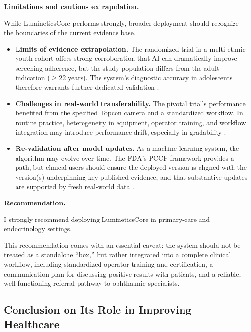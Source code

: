 \documentclass[sigplan,screen]{acmart}
\begin{document}
\textbf{Limitations and cautious extrapolation.}

While LumineticsCore performs strongly, broader deployment should recognize the boundaries of the current evidence base.

\begin{itemize}
\item \textbf{Limits of evidence extrapolation.} The randomized trial in a multi-ethnic youth cohort offers strong corroboration that AI can dramatically improve screening adherence, but the study population differs from the adult indication ($\geq$22 years). The system's diagnostic accuracy in adolescents therefore warrants further dedicated validation \cite{wolf2024autonomous}.

\item \textbf{Challenges in real-world transferability.} The pivotal trial's performance benefited from the specified Topcon camera and a standardized workflow. In routine practice, heterogeneity in equipment, operator training, and workflow integration may introduce performance drift, especially in gradability \cite{fda2018denovo_summary, abramoff2018pivotal}.

\item \textbf{Re-validation after model updates.} As a machine-learning system, the algorithm may evolve over time. The FDA's PCCP framework provides a path, but clinical users should ensure the deployed version is aligned with the version(s) underpinning key published evidence, and that substantive updates are supported by fresh real-world data \cite{fda2018denovo_summary, abramoff2018pivotal}.
\end{itemize}

\textbf{Recommendation.}

I strongly recommend deploying LumineticsCore in primary-care and endocrinology settings.

This recommendation comes with an essential caveat: the system should not be treated as a standalone ``box,'' but rather integrated into a complete clinical workflow, including standardized operator training and certification, a communication plan for discussing positive results with patients, and a reliable, well-functioning referral pathway to ophthalmic specialists.

\subsection{Conclusion on Its Role in Improving Healthcare}
\end{document}
